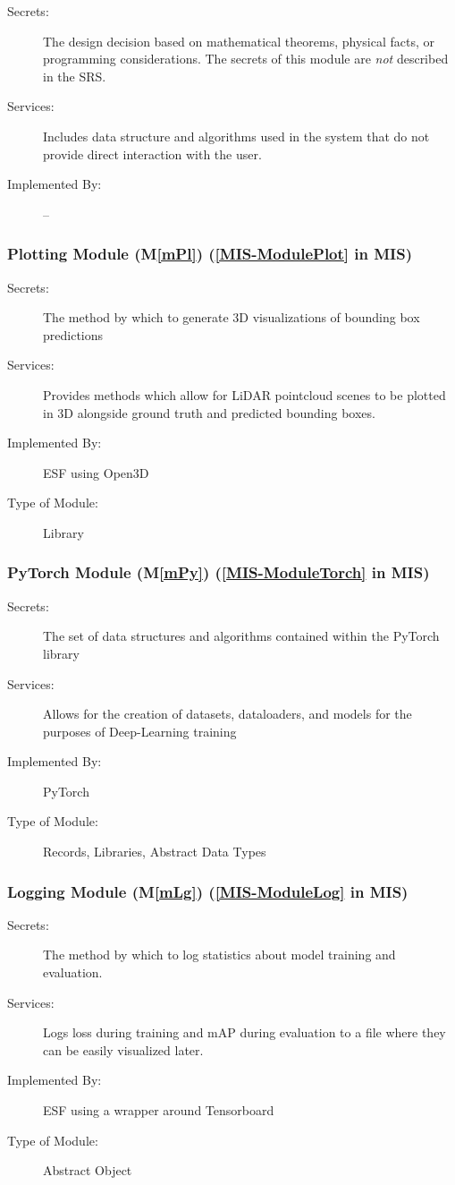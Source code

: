 \documentclass[12pt, titlepage]{article}
\newcommand{\ProjectName}{ESF }
\newcommand{\mref}[1]{M\ref{#1}}
\begin{document}
\begin{description}
\item[Secrets:] The design decision based on mathematical theorems, physical
  facts, or programming considerations. The secrets of this module are
  \emph{not} described in the SRS.
\item[Services:] Includes data structure and algorithms used in the system that
  do not provide direct interaction with the user. 
\item[Implemented By:] --
\end{description}

\subsubsection{Plotting Module (\mref{mPl}) (\ref{MIS-ModulePlot} in MIS)}
\begin{description}
\item[Secrets:] The method by which to generate 3D visualizations of bounding box predictions
\item[Services:] Provides methods which allow for LiDAR pointcloud scenes to be plotted in 3D alongside ground truth and predicted bounding boxes. 
\item[Implemented By:] \ProjectName{} using Open3D
\item[Type of Module:] Library
\end{description}

\subsubsection{PyTorch Module (\mref{mPy}) (\ref{MIS-ModuleTorch} in MIS)}
\begin{description}
\item[Secrets:] The set of data structures and algorithms contained within the PyTorch library
\item[Services:] Allows for the creation of datasets, dataloaders, and models for the purposes of Deep-Learning training
\item[Implemented By:] PyTorch
\item[Type of Module:] Records, Libraries, Abstract Data Types
\end{description}

\subsubsection{Logging Module (\mref{mLg}) (\ref{MIS-ModuleLog} in MIS)}
\begin{description}
\item[Secrets:] The method by which to log statistics about model training and evaluation.
\item[Services:] Logs loss during training and mAP during evaluation to a file where they can be easily visualized later.
\item[Implemented By:] \ProjectName using a wrapper around Tensorboard
\item[Type of Module:] Abstract Object
\end{description}
\end{document}
